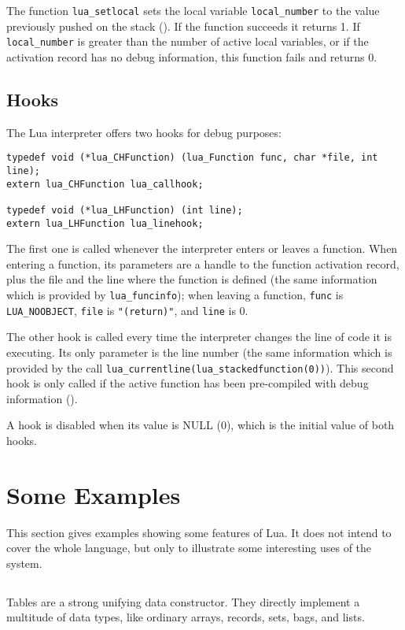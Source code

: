 The function \verb'lua_setlocal' sets the local variable
\verb'local_number' to the value previously pushed on the stack
().
If the function succeeds it returns 1.
If \verb'local_number' is greater than the number
of active local variables,
or if the activation record has no debug information,
this function fails and returns 0.

\subsection{Hooks}

The Lua interpreter offers two hooks for debug purposes:
\begin{verbatim}
typedef void (*lua_CHFunction) (lua_Function func, char *file, int line);
extern lua_CHFunction lua_callhook;

typedef void (*lua_LHFunction) (int line);
extern lua_LHFunction lua_linehook;
\end{verbatim}
The first one is called whenever the interpreter enters or leaves a
function.
When entering a function,
its parameters are a handle to the function activation record,
plus the file and the line where the function is defined (the same
information which is provided by \verb'lua_funcinfo');
when leaving a function, \verb'func' is \verb'LUA_NOOBJECT',
\verb'file' is \verb'"(return)"', and \verb'line' is 0.

The other hook is called every time the interpreter changes
the line of code it is executing.
Its only parameter is the line number
(the same information which is provided by the call
\verb'lua_currentline(lua_stackedfunction(0))').
This second hook is only called if the active function
has been pre-compiled with debug information ().

A hook is disabled when its value is NULL (0),
which is the initial value of both hooks.


\section{Some Examples}

This section gives examples showing some features of Lua.
It does not intend to cover the whole language,
but only to illustrate some interesting uses of the system.


\subsection{}
Tables are a strong unifying data constructor.
They directly implement a multitude of data types,
like ordinary arrays, records, sets, bags, and lists.

